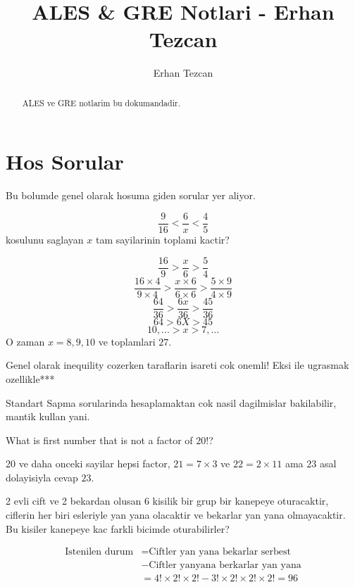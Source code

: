 \documentclass{ximera}
\title{ALES \& GRE Notlari - Erhan Tezcan}
\author{Erhan Tezcan}
\begin{document}
\begin{abstract}
    ALES ve GRE notlarim bu dokumandadir.
\end{abstract}
\maketitle

\section{Hos Sorular}
Bu bolumde genel olarak hosuma giden sorular yer aliyor.
\begin{example}
$$
\frac{9}{16} < \frac{6}{x} < \frac{4}{5}
$$
kosulunu saglayan $x$ tam sayilarinin toplami kactir?
\end{example}
\begin{explanation}
$$
\frac{16}{9} > \frac{x}{6} > \frac{5}{4}
$$
$$
\frac{16\times4}{9\times4} > \frac{x\times6}{6\times6} > \frac{5\times9}{4\times9}
$$
$$
\frac{64}{36} > \frac{6x}{36} > \frac{45}{36}
$$
$$
64 > 6X > 45
$$
$$
10,... > x > 7,...
$$
O zaman $x = 8, 9, 10$ ve toplamlari $27$.
\end{explanation}

Genel olarak inequility cozerken taraflarin isareti cok onemli! Eksi ile ugrasmak ozellikle*** \par

Standart Sapma sorularinda hesaplamaktan cok nasil dagilmislar bakilabilir, mantik kullan yani. \par 

\begin{example}
What is first number that is not a factor of $20!$? 
\end{example}
\begin{explanation}
20 ve daha onceki sayilar hepsi factor, $21 = 7\times3$ ve $22=2\times11$ ama $23$ asal dolayisiyla cevap $23$.
\end{explanation}

\begin{example}
2 evli cift ve 2 bekardan olusan 6 kisilik bir grup bir kanepeye oturacaktir, ciflerin her biri esleriyle yan yana olacaktir ve bekarlar yan yana olmayacaktir. Bu kisiler kanepeye kac farkli bicimde oturabilirler? 
\end{example}
\begin{explanation}
\begin{equation*}
    \begin{split}
        \text{Istenilen durum} &= \text{Ciftler yan yana bekarlar serbest} \\
        &- \text{Ciftler yanyana berkarlar yan yana} \\
        &= 4! \times 2! \times 2! - 3! \times 2! \times 2! \times 2! = 96
    \end{split}
\end{equation*}
\end{explanation}
\end{document}
